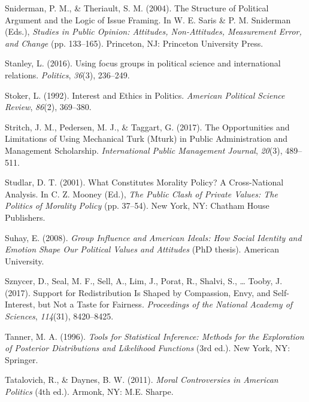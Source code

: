 \documentclass[12pt,econ]{sources/authesis}
\begin{document}
\leavevmode\hypertarget{ref-sniderman_structure_2004}{}%
Sniderman, P. M., \& Theriault, S. M. (2004). The Structure of Political Argument and the Logic of Issue Framing. In W. E. Saris \& P. M. Sniderman (Eds.), \emph{Studies in Public Opinion: Attitudes, Non-Attitudes, Measurement Error, and Change} (pp. 133--165). Princeton, NJ: Princeton University Press.

\leavevmode\hypertarget{ref-stanley_2016_using}{}%
Stanley, L. (2016). Using focus groups in political science and international relations. \emph{Politics}, \emph{36}(3), 236--249.

\leavevmode\hypertarget{ref-stoker_1992_interest}{}%
Stoker, L. (1992). Interest and Ethics in Politics. \emph{American Political Science Review}, \emph{86}(2), 369--380.

\leavevmode\hypertarget{ref-stritch_2017_opportunities}{}%
Stritch, J. M., Pedersen, M. J., \& Taggart, G. (2017). The Opportunities and Limitations of Using Mechanical Turk (Mturk) in Public Administration and Management Scholarship. \emph{International Public Management Journal}, \emph{20}(3), 489--511.

\leavevmode\hypertarget{ref-studlar_2001_what}{}%
Studlar, D. T. (2001). What Constitutes Morality Policy? A Cross-National Analysis. In C. Z. Mooney (Ed.), \emph{The Public Clash of Private Values: The Politics of Morality Policy} (pp. 37--54). New York, NY: Chatham House Publishers.

\leavevmode\hypertarget{ref-suhay_2008_group}{}%
Suhay, E. (2008). \emph{Group Influence and American Ideals: How Social Identity and Emotion Shape Our Political Values and Attitudes} (PhD thesis). American University.

\leavevmode\hypertarget{ref-sznycer_2017_support}{}%
Sznycer, D., Seal, M. F., Sell, A., Lim, J., Porat, R., Shalvi, S., \ldots{} Tooby, J. (2017). Support for Redistribution Is Shaped by Compassion, Envy, and Self-Interest, but Not a Taste for Fairness. \emph{Proceedings of the National Academy of Sciences}, \emph{114}(31), 8420--8425.

\leavevmode\hypertarget{ref-tanner_1996_tools}{}%
Tanner, M. A. (1996). \emph{Tools for Statistical Inference: Methods for the Exploration of Posterior Distributions and Likelihood Functions} (3rd ed.). New York, NY: Springer.

\leavevmode\hypertarget{ref-tatalovich_moral_2011}{}%
Tatalovich, R., \& Daynes, B. W. (2011). \emph{Moral Controversies in American Politics} (4th ed.). Armonk, NY: M.E. Sharpe.
\end{document}

